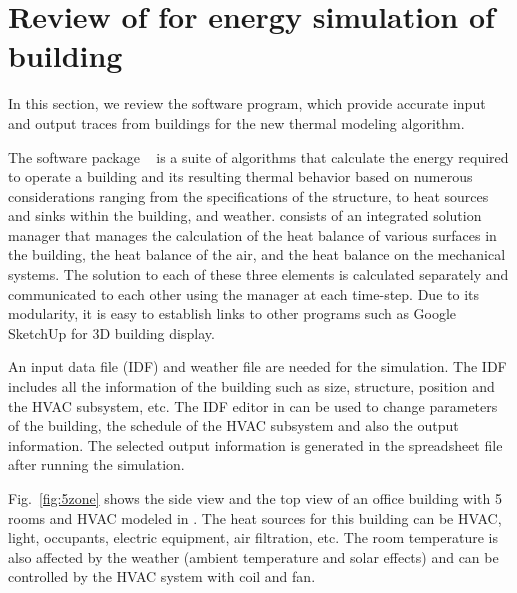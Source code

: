 \section{Review of \EP{} for energy simulation of building} %

In this section, we review the \EP{} software program, which provide
accurate input and output traces from buildings for the new thermal
modeling algorithm.

The \EP{} software package ~\cite{energyplus:2001vf} is a suite of
algorithms that calculate the energy required to operate a building
and its resulting thermal behavior based on numerous considerations
ranging from the specifications of the structure, to heat sources and
sinks within the building, and weather.
\EP{} consists of  an integrated solution
manager that manages the calculation of the heat balance of various
surfaces in the building, the heat balance of the air, and the heat
balance on the mechanical systems. The solution to each of these three
elements is calculated separately and communicated to each other
using the manager at each time-step.
Due to its modularity, it is easy to establish links to other programs such as Google SketchUp for 3D building display.

An input data file (IDF) and weather file are needed for the \EP{}
simulation. The IDF includes all the information of the building such
as size, structure, position and the HVAC subsystem, etc. The IDF
editor in \EP{} can be used to change parameters of the building, the
schedule of the HVAC subsystem and also the output information. The
selected output information is generated in the spreadsheet file
after running the simulation.

Fig.~\ref{fig:5zone} shows the side view and the top view of an office building
with 5 rooms and HVAC modeled in \EP{}.  The heat sources for this building
can be HVAC, light, occupants, electric equipment, air filtration, etc. The
room temperature is also affected by the weather (ambient temperature and solar
effects) and can be controlled by the HVAC system with coil
and fan.

